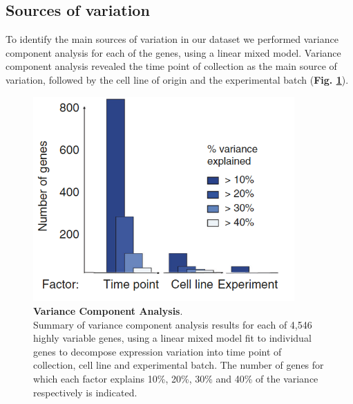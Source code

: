 \newpage

\subsection{Sources of variation} 
\label{sec:endodiff_sources_of_variation}


To identify the main sources of variation in our dataset we performed variance component analysis for each of the genes, using a linear mixed model.
Variance component analysis revealed the time point of collection as the main source of variation, followed by the cell line of origin and the experimental batch (\textbf{Fig. \ref{fig:endodiff_vca}}).\\

\begin{figure}[h]
\includegraphics[width=10cm]{Chapter4/Fig/endodiff_variance_component.png}
\caption[Variance Component Analysis]{\textbf{Variance Component Analysis}.\\
Summary of variance component analysis results for each of 4,546 highly variable genes, using a linear mixed model fit to individual genes to decompose expression variation into
time point of collection, cell line and experimental batch.
The number of genes for which each factor explains 10\%, 20\%, 30\% and 40\% of the variance respectively is indicated.}
\label{fig:endodiff_vca}
\end{figure}

